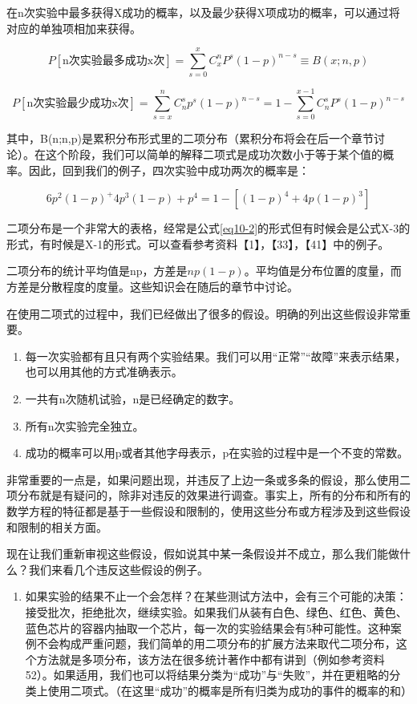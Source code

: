 \documentclass[cn,11pt,chinese]{elegantbook}
\begin{document}
{在n次实验中最多获得X成功的概率，以及最少获得X项成功的概率，可以通过将对应的单独项相加来获得。

\begin{equation}\label{eq10-2}
P[\mbox{n次实验最多成功x次}]=\sum_{s=0}^{x}C^n_xP^s(1-p)^{n-s}\equiv B(x;n,p) 
\end{equation}


\begin{equation}\label{eq10-3}
P[\mbox{n次实验最少成功x次}]=\sum_{s=x}^{n}C_n^sp^s(1-p)^{n-s}=1-\sum_{s=0}^{x-1}C_n^sP^s(1-p)^{n-s} 
\end{equation}

其中，B(n;n,p)是累积分布形式里的二项分布（累积分布将会在后一个章节讨论）。在这个阶段，我们可以简单的解释二项式是成功次数小于等于某个值的概率。因此，回到我们的例子，四次实验中成功两次的概率是：

$$
6p^2(1-p)^+4p^3(1-p)+p^4=1-[(1-p)^4+4p(1-p)^3]$$

二项分布是一个非常大的表格，经常是公式\ref{eq10-2}的形式但有时候会是公式X-3的形式，有时候是X-1的形式。可以查看参考资料【1】，【33】，【41】中的例子。

二项分布的统计平均值是np，方差是$np(1-p)$。平均值是分布位置的度量，而方差是分散程度的度量。这些知识会在随后的章节中讨论。

在使用二项式的过程中，我们已经做出了很多的假设。明确的列出这些假设非常重要。

\begin{enumerate}
	\item 每一次实验都有且只有两个实验结果。我们可以用“正常”“故障”来表示结果，也可以用其他的方式准确表示。
	\item 一共有n次随机试验，n是已经确定的数字。
\item 	所有n次实验完全独立。
\item 	成功的概率可以用p或者其他字母表示，p在实验的过程中是一个不变的常数。
\end{enumerate}

非常重要的一点是，如果问题出现，并违反了上边一条或多条的假设，那么使用二项分布就是有疑问的，除非对违反的效果进行调查。事实上，所有的分布和所有的数学方程的特征都是基于一些假设和限制的，使用这些分布或方程涉及到这些假设和限制的相关方面。

现在让我们重新审视这些假设，假如说其中某一条假设并不成立，那么我们能做什么？我们来看几个违反这些假设的例子。


\begin{enumerate}
	\item 如果实验的结果不止一个会怎样？在某些测试方法中，会有三个可能的决策：接受批次，拒绝批次，继续实验。如果我们从装有白色、绿色、红色、黄色、蓝色芯片的容器内抽取一个芯片，每一次的实验结果会有5种可能性。这种案例不会构成严重问题，我们简单的用二项分布的扩展方法来取代二项分布，这个方法就是多项分布，该方法在很多统计著作中都有讲到（例如参考资料52）。如果适用，我们也可以将结果分类为“成功”与“失败”，并在更粗略的分类上使用二项式。（在这里“成功”的概率是所有归类为成功的事件的概率的和）
	

\end{enumerate}}
\end{document}
